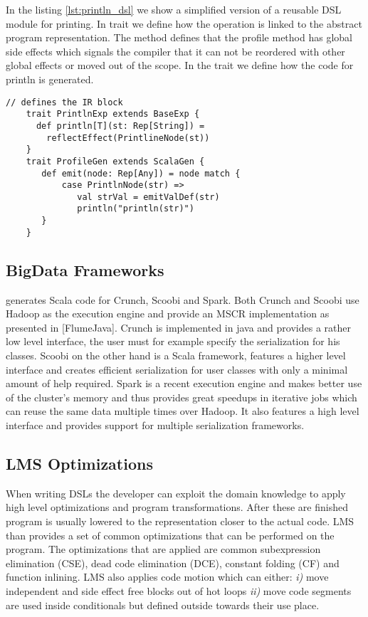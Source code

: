 In the listing \ref{lst:println_dsl} we show a simplified version of a reusable DSL module for printing. In trait  we define how the  operation is linked to the abstract program representation. The  method defines that the profile method has global side effects which signals the compiler that it can not be reordered with other global effects or moved out of the scope. In the  trait we define how the code for println is generated. 

\begin{lstlisting}[name=code, caption=Example of how the DSL module is specified. Example module is used for profiling a block of code and it can be reused in any other Scala backed DSL. \scode{Rep} types., captionpos=b, label=lst:println_dsl, float=t]
    // defines the IR block
    trait PrintlnExp extends BaseExp {
      def println[T](st: Rep[String]) =
        reflectEffect(PrintlineNode(st)) 
    }
    trait ProfileGen extends ScalaGen {
       def emit(node: Rep[Any]) = node match {
           case PrintlnNode(str) =>
              val strVal = emitValDef(str)  
              println("println(str)")
       }
    }
\end{lstlisting}

\subsection{BigData Frameworks}
\tool generates Scala code for Crunch, Scoobi and Spark. Both Crunch and Scoobi use Hadoop as the execution engine and provide an MSCR implementation as presented in [FlumeJava]. Crunch is implemented in java and provides a rather low level interface, the user must for example specify the serialization for his classes. Scoobi on the other hand is a Scala framework, features a higher level interface and creates efficient serialization for user classes with only a minimal amount of help required. Spark is a recent execution engine and makes better use of the cluster's memory and thus provides great speedups in iterative jobs which can reuse the same data multiple times over Hadoop. It also features a high level interface and provides support for multiple serialization frameworks. 

\subsection{LMS Optimizations}
\label{sbusec:lms-optimizations}
When writing DSLs the developer can exploit the domain knowledge to apply high level optimizations and program transformations. After these are finished program is usually lowered to the representation closer to the actual code. LMS than provides a set of common optimizations that can be performed on the program. The optimizations that are applied are common subexpression elimination (CSE), dead code elimination (DCE), constant folding (CF) and function inlining. LMS also applies code motion which can either: \emph{i)} move independent and side effect free blocks out of hot loops \emph{ii)} move code segments are used inside conditionals but defined outside towards their use place.   

